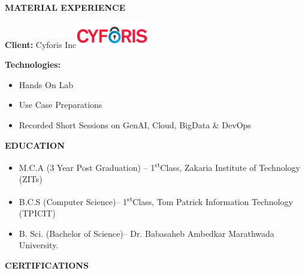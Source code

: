 \documentclass[a4paper]{article}
\begin{document}
\textbf{MATERIAL EXPERIENCE}

\textbf{Client:} Cyforis
Inc\includegraphics[width=1.25in,height=0.44792in]{media/image22.png}

\textbf{Technologies:}

\begin{itemize}
\item
  Hands On Lab
\item
  Use Case Preparations
\item
  Recorded Short Sessions on GenAI, Cloud, BigData \& DevOps
\end{itemize}

\textbf{EDUCATION}

\begin{itemize}
\item
  M.C.A (3 Year Post Graduation) -- 1\textsuperscript{st}Class, Zakaria
  Institute of Technology (ZITs)
\item
  B.C.S (Computer Science)-- 1\textsuperscript{st}Class, Tom Patrick
  Information Technology (TPICIT)
\item
  B. Sci. (Bachelor of Science)-- Dr. Babasaheb Ambedkar Marathwada
  University.
\end{itemize}

\textbf{CERTIFICATIONS}
\end{document}
